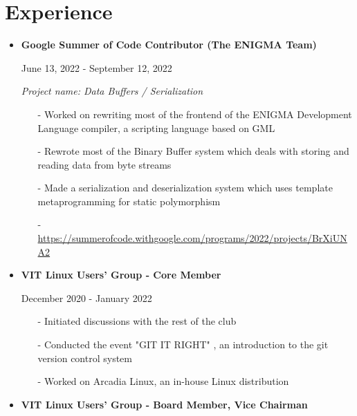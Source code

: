 \documentclass[12pt]{article}
\newcommand{\primarycolor}{red}
\newcommand{\mysection}[1]{\section{#1}\vspace{-1ex}}
\begin{document}
    \mysection{Experience}
    {
        \begin{itemize}
            \item
                \textbf{Google Summer of Code Contributor (The ENIGMA Team)}

                {\color{\primarycolor}June 13, 2022 - September 12, 2022}

                \textit{Project name: Data Buffers / Serialization}
                \vspace{-1ex}
                \begin{itemize}[itemsep=1ex, leftmargin=3.5ex]
                    \item[-] Worked on rewriting most of the frontend of the ENIGMA Development Language compiler, a scripting language based on GML
                    \item[-] Rewrote most of the Binary Buffer system which deals with storing and reading data from byte streams
                    \item[-] Made a serialization and deserialization system which uses template metaprogramming for static polymorphism
                    \item[-] \url{https://summerofcode.withgoogle.com/programs/2022/projects/BrXiUNA2}
                \end{itemize}

            \item
                \textbf{VIT Linux Users' Group - Core Member}

                {\color{\primarycolor}December 2020 - January 2022}
                \vspace{-1ex}
                \begin{itemize}[itemsep=1ex, leftmargin=3.5ex]
                    \item[-] Initiated discussions with the rest of the club
                    \item[-] Conducted the event "GIT IT RIGHT" , an introduction to the git version control system
                    \item[-] Worked on Arcadia Linux, an in-house Linux distribution
                \end{itemize}

            \item
                \textbf{VIT Linux Users' Group - Board Member, Vice Chairman}


\end{itemize}}
\end{document}
